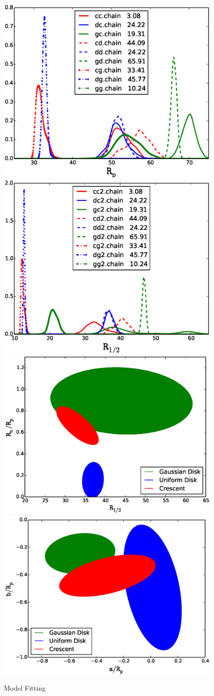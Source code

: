 \begin{figure}
\centering
\vskip-1in
  \includegraphics[width=0.45\hsize]{plots/Rp4all.eps}
  \includegraphics[width=0.45\hsize]{plots/Rhalf4all.eps}\\
  \includegraphics[width=0.45\hsize]{plots/Rhalf_RnRp.eps}
  \includegraphics[width=0.45\hsize]{plots/aRp_bRp.eps}
\vskip1in
\caption{\label{fig:mcmc} Model Fitting}
\end{figure}


